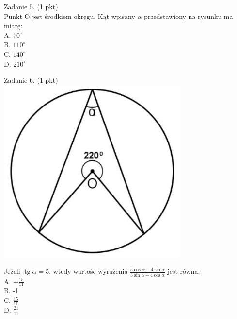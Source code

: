 \documentclass[10pt]{article}
\begin{document}
Zadanie 5. (1 pkt)\\
Punkt O jest środkiem okręgu. Kąt wpisany \(\alpha\) przedstawiony na rysunku ma miarę:\\
A. \(70^{\circ}\)\\
B. \(110^{\circ}\)\\
C. \(140^{\circ}\)\\
D. \(210^{\circ}\)

Zadanie 6. (1 pkt)\\
\includegraphics[max width=\textwidth, center]{2024_11_21_b31e6de468170710de69g-02(4)}

Jeżeli \(\operatorname{tg} \alpha=5\), wtedy wartość wyrażenia \(\frac{5 \cos \alpha-4 \sin \alpha}{3 \sin \alpha-4 \cos \alpha}\) jest równa:\\
A. \(-\frac{15}{11}\)\\
B. -1\\
C. \(\frac{15}{11}\)\\
D. \(\frac{21}{11}\)
\end{document}
